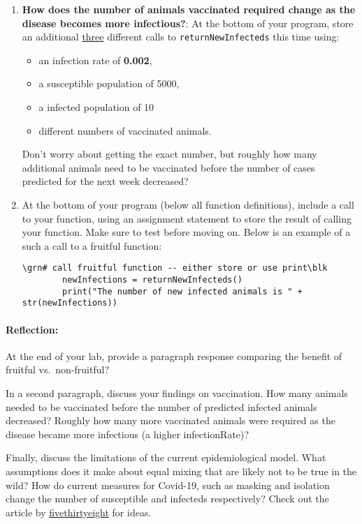 \documentclass[10pt]{article}
\newcommand{\blk}{\color{black}}
\newcommand{\grn}{\color{darkgreen}}
\begin{document}
\begin{enumerate}
         \item {\bf How does the number of animals vaccinated required change as the disease becomes more infectious?}: \newline 
         At the bottom of your program, store an additional \uline{three}
            different calls to {\tt returnNewInfecteds} this time using:
            \begin{itemize}
            \item an infection rate of {\bf 0.002},
            \item a susceptible population of 5000, 
            \item a infected population of 10
            \item different numbers of vaccinated animals. 
            \end{itemize}
            Don't worry about getting the exact number, but roughly how many additional animals need to be vaccinated before the number of cases predicted for the next week decreased? 
        \item At the bottom of your program (below all function definitions),
            include a call to your function, using an assignment statement
            to store the result of calling your function.
            Make sure to test before moving on. Below is an example of a such a call to a fruitful function:
\begin{Verbatim}[commandchars=\\\{\}]
        \grn# call fruitful function -- either store or use print\blk
        newInfections = returnNewInfecteds()
        print("The number of new infected animals is " + str(newInfections))
\end{Verbatim}

  \end{enumerate}

  \paragraph{Reflection:} 
  At the end of your lab, provide a paragraph response comparing the benefit of fruitful vs.\ non-fruitful?

  In a second paragraph, discuss your findings on vaccination. How many animals needed to be vaccinated before the number of predicted infected animals decreased? Roughly how many more vaccinated animals were required as the disease became more infectious (a higher infectionRate)?
  
  Finally, discuss the limitations of the current epidemiological model. What assumptions does it make about equal mixing that are likely not to be true in the wild? How do current measures for Covid-19, such as masking and isolation change the number of susceptible and infecteds respectively? Check out the article by \href{https://fivethirtyeight.com/features/why-its-so-freaking-hard-to-make-a-good-covid-19-model/}{fivethirtyeight} for ideas.
\end{document}
